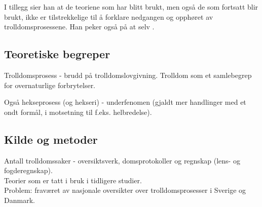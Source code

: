 \documentclass[12pt]{article}
\begin{document}

I tillegg sier han at de teoriene som har blitt brukt, men også de som fortsatt blir brukt, ikke er tilstrekkelige til å forklare nedgangen og opphøret av trolldomsprosessene. Han peker også på at selv .

\subsection{Teoretiske begreper}
Trolldomsprosess - brudd på trolldomslovgivning. Trolldom som et samlebegrep for overnaturlige forbrytelser.

Også hekseprosess (og hekseri) - underfenomen (gjaldt mer handlinger med et ondt formål, i motsetning til f.eks. helbredelse).

\subsection{Kilde og metoder}
Antall trolldomssaker - oversiktsverk, domsprotokoller og regnskap (lens- og fogderegnskap).\\
Teorier som er tatt i bruk i tidligere studier. \\
Problem: fraværet av nasjonale oversikter over trolldomsprosesser i Sverige og Danmark.
\end{document}
